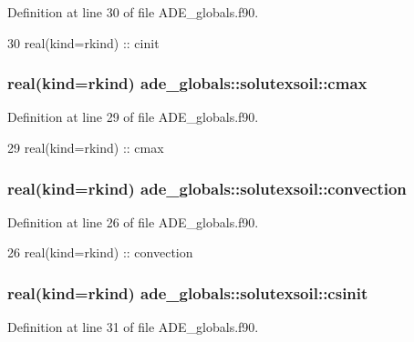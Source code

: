 Definition at line 30 of file A\+D\+E\+\_\+globals.\+f90.


\begin{DoxyCode}
30     \textcolor{keywordtype}{real(kind=rkind)} :: cinit
\end{DoxyCode}
\subsubsection[{cmax}]{\setlength{\rightskip}{0pt plus 5cm}real(kind=rkind) ade\+\_\+globals\+::solutexsoil\+::cmax}\label{structade__globals_1_1solutexsoil_a977bd3a1e605f53be55c86ea0149ead4}


Definition at line 29 of file A\+D\+E\+\_\+globals.\+f90.


\begin{DoxyCode}
29     \textcolor{keywordtype}{real(kind=rkind)} :: cmax
\end{DoxyCode}
\subsubsection[{convection}]{\setlength{\rightskip}{0pt plus 5cm}real(kind=rkind) ade\+\_\+globals\+::solutexsoil\+::convection}\label{structade__globals_1_1solutexsoil_a9a934fb2719eb887d9d6b0a607fe5b77}


Definition at line 26 of file A\+D\+E\+\_\+globals.\+f90.


\begin{DoxyCode}
26     \textcolor{keywordtype}{real(kind=rkind)} :: convection
\end{DoxyCode}
\subsubsection[{csinit}]{\setlength{\rightskip}{0pt plus 5cm}real(kind=rkind) ade\+\_\+globals\+::solutexsoil\+::csinit}\label{structade__globals_1_1solutexsoil_a2dc897b361450561de02165d0a66217a}


Definition at line 31 of file A\+D\+E\+\_\+globals.\+f90.


